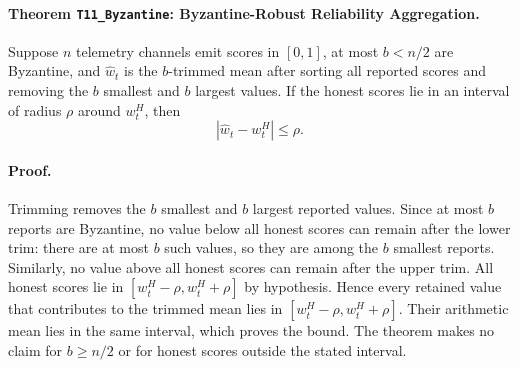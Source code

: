 \paragraph{Theorem \texttt{T11\_Byzantine}: Byzantine-Robust Reliability Aggregation.}
Suppose \(n\) telemetry channels emit scores in \([0,1]\), at most
\(b<n/2\) are Byzantine, and \(\hat w_t\) is the \(b\)-trimmed mean after
sorting all reported scores and removing the \(b\) smallest and \(b\) largest
values. If the honest scores lie in an interval of radius \(\rho\) around
\(w_t^H\), then
\[
  |\hat w_t-w_t^H|\le \rho .
\]

\paragraph{Proof.}
Trimming removes the \(b\) smallest and \(b\) largest reported values. Since at
most \(b\) reports are Byzantine, no value below all honest scores can remain
after the lower trim: there are at most \(b\) such values, so they are among the
\(b\) smallest reports. Similarly, no value above all honest scores can remain
after the upper trim. All honest scores lie in
\([w_t^H-\rho,w_t^H+\rho]\) by hypothesis. Hence every retained value that
contributes to the trimmed mean lies in
\([w_t^H-\rho,w_t^H+\rho]\). Their arithmetic mean lies in the same interval,
which proves the bound. The theorem makes no claim for \(b\ge n/2\) or for
honest scores outside the stated interval.
